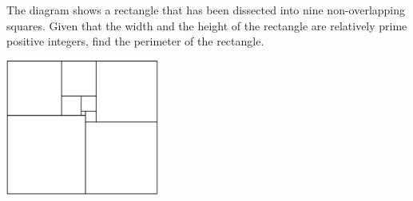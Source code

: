 The diagram shows a rectangle that has been dissected into nine non-overlapping squares. Given that the width and the height of the rectangle are relatively prime positive integers, find the perimeter of the rectangle.

\begin{center}
\includegraphics[width = 50.400000000000006mm]{img/fig0.png}
\end{center}